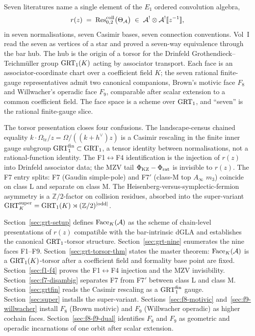Seven literatures name a single element of the $E_1$ ordered
convolution algebra,
\[
 r(z) \;=\; \operatorname{Res}^{\mathrm{coll}}_{0,2}\bigl(\Theta_{\mathcal{A}}\bigr)
 \;\in\; \mathcal{A}^{!}\otimes\mathcal{A}^{!}[\![z^{-1}]\!],
\]
in seven normalisations, seven Casimir bases, seven connection
conventions. Vol~I read the seven as vertices of a star and
proved a seven-way equivalence through the bar hub. The hub is
the origin of a torsor for the Drinfeld
Grothendieck--Teichm\"uller group $\mathrm{GRT}_1(K)$ acting by associator
transport. Each face is an associator-coordinate chart over a
coefficient field $K$; the seven rational finite-gauge
representatives admit two canonical companions, Brown's motivic
face $F_8$ and Willwacher's operadic face $F_9$, comparable after
scalar extension to a common coefficient field. The face space is
a scheme over $\mathrm{GRT}_1$, and ``seven'' is the rational finite-gauge
slice.

The torsor presentation closes four confusions. The
landscape-census chained equality
$k\cdot\Omega_{\mathrm{tr}}/z = \Omega/((k+h^{\vee})z)$ is a
Casimir rescaling in the finite inner gauge subgroup
$\mathrm{GRT}_1^{\mathrm{fin}}\subset\mathrm{GRT}_1$, a tensor identity between
normalisations, not a rational-function identity. The
F1$\leftrightarrow$F4 identification is the injection of $r(z)$
into Drinfeld associator data; the MZV tail
$\Phi_{\mathrm{KZ}}-\Phi_{\mathrm{rat}}$ is invisible to $r(z)$. The F7 entry
splits: F7 (Gaudin simple-pole) and F7$'$ (class-M top $A_\infty$
$m_3$) coincide on class L and separate on class M. The
Heisenberg-versus-symplectic-fermion asymmetry is a
$\mathbb{Z}/2$-factor on collision residues, absorbed into the
super-variant
$\mathrm{GRT}^{\mathrm{super}}_K = \mathrm{GRT}_1(K)\rtimes(\mathbb{Z}/2)^{|\mathrm{odd}|}$.

Section~\ref{sec:grt-setup} defines $\mathrm{Face}_K(\mathcal{A})$ as the scheme
of chain-level presentations of $r(z)$ compatible with the
bar-intrinsic dGLA and establishes the canonical $\mathrm{GRT}_1$-torsor
structure. Section~\ref{sec:grt-nine} enumerates the nine faces
F1--F9. Section~\ref{sec:grt-torsor-thm} states the master
theorem: $\mathrm{Face}_K(\mathcal{A})$ is a $\mathrm{GRT}_1(K)$-torsor after a coefficient
field and formality base point are fixed. Section~\ref{sec:f1-f4}
proves the F1$\leftrightarrow$F4 injection and the MZV
invisibility. Section~\ref{sec:f7-disambig} separates F7 from
F7$'$ between class L and class M. Section~\ref{sec:grtfin}
reads the Casimir rescaling as a $\mathrm{GRT}_1^{\mathrm{fin}}$ gauge.
Section~\ref{sec:super} installs the super-variant.
Sections~\ref{sec:f8-motivic} and~\ref{sec:f9-willwacher}
install $F_8$ (Brown motivic) and $F_9$ (Willwacher operadic) as
higher cochain faces. Section~\ref{sec:f8-f9-dual} identifies
$F_8$ and $F_9$ as geometric and operadic incarnations of one
orbit after scalar extension.

